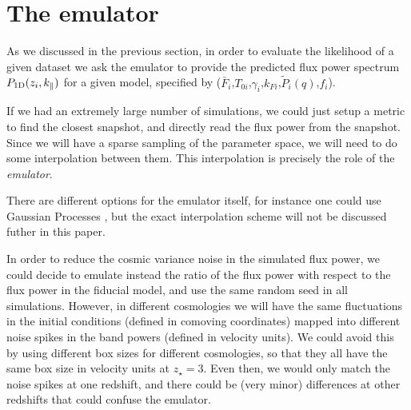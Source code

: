 \section{The emulator} \label{sec:emu}

As we discussed in the previous section, in order to evaluate the
likelihood of a given dataset we ask the emulator to provide the predicted
flux power spectrum $P_{\rm 1D}(z_i,k_\parallel)$ for a given model,
specified by ($\bar F_i$,$T_{0i}$,$\gamma_i$,$k_{Fi}$,$\tilde P_i(q)$,$f_i$).


If we had an extremely large number of simulations, we could just setup a
metric to find the closest snapshot, and directly read the flux power
from the snapshot.
Since we will have a sparse sampling of the parameter space, we will need
to do some interpolation between them. 
This interpolation is precisely the role of the \textit{emulator}.

There are different options for the emulator itself, for instance one could
use Gaussian Processes \cite{Heitmann2009,Heitmann2014,SLAC2018,
Walther2018a,Bird2018,Rogers2018c}, but the exact interpolation scheme will
not be discussed futher in this paper.

In order to reduce the cosmic variance noise in the simulated flux power,
we could decide to emulate instead the ratio of the flux power with respect
to the flux power in the fiducial model, and use the same random seed in all
simulations.
However, in different cosmologies we will have the same fluctuations in the
initial conditions (defined in comoving coordinates) mapped into different 
noise spikes in the band powers (defined in velocity units).
We could avoid this by using different box sizes for different cosmologies,
so that they all have the same box size in velocity units at $z_\star=3$.
Even then, we would only match the noise spikes at one redshift, and there
could be (very minor) differences at other redshifts that could confuse
the emulator.

